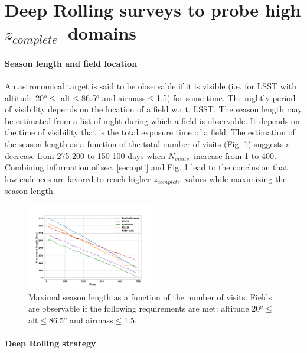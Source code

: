 \documentclass[skiphelvet,twocolumn]{aastex63}
\newcommand{\snrb}{\mbox{$SNR^b$}}
\newcommand{\zcomp}{\mbox{$z_{complete}$}}
\newcommand{\nvisits}{$N_{visits}$}
\begin{document}
\section{Deep Rolling surveys to probe high \zcomp~domains}
\label{sec:scenario}
\paragraph{Season length and field location}
An astronomical target is said to be observable if it is visible (i.e. for LSST with altitude 20$^o\leq$ alt$\leq$86.5$^o$ and airmass$\leq$1.5) for some time. The nightly period of visibility depends on the location of a field w.r.t. LSST. The season length may be estimated from a list of night during which a field is observable. It depends on the time of visibility that is the total exposure time of a field. The estimation of the season length as a function of the total number of visits (Fig. \ref{fig:seasonlength_nvisits}) suggests a decrease from 275-200 to 150-100 days when \nvisits~increase from 1 to 400.  Combining information of sec. \ref{sec:opti} and Fig. \ref{fig:seasonlength_nvisits} lead to the conclusion that low cadences are favored to reach higher \zcomp~values while maximizing the season length.

\begin{figure}[htbp]
\begin{center}
  \includegraphics[width=0.5\textwidth]{seasonlength_nvisits.png}
 \caption{Maximal season length as a function of the number of visits. Fields are observable if the following requirements are met: altitude 20$^o\leq$ alt$\leq$86.5$^o$ and airmass$\leq$1.5.}\label{fig:seasonlength_nvisits}
\end{center}
\end{figure}

\paragraph{Deep Rolling strategy}
\end{document}
